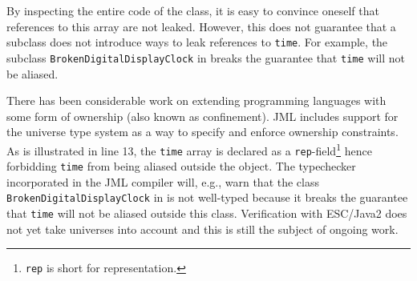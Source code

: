 \documentclass{llncs}
\begin{document}
By inspecting the entire code of the class, it is easy to convince
oneself that references to this array are not leaked.
However, this does not guarantee that a subclass does not introduce
ways to leak references to \texttt{time}.
For example, the subclass \texttt{BrokenDigitalDisplayClock} in 
 breaks the guarantee that \texttt{time}
will not be aliased.

There has been considerable work on extending programming languages
with some form of ownership (also known as confinement).
JML includes support for the universe type system
\cite{Mueller-Poetzsch-Heffter-Leavens03} as a way to specify
and enforce ownership constraints. As is illustrated in 
 line 13, the \texttt{time} array is declared
as a \texttt{rep}-field\footnote{\texttt{rep} is short for representation.}
hence forbidding \texttt{time} from being aliased outside the object.
The typechecker incorporated in the JML compiler
will, e.g., warn that the class \texttt{BrokenDigitalDisplayClock}
in  is not well-typed because it breaks 
the guarantee that \texttt{time} will not be aliased outside this class.
Verification with ESC/Java2 does not yet take universes into account
and this is still the subject of ongoing work.

% 
%

\end{document}
